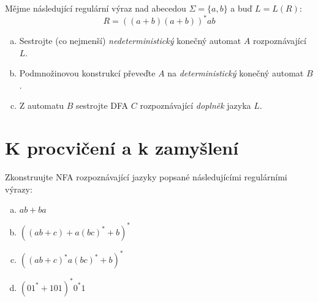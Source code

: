 \documentclass[a4paper,12pt]{amsart}
\begin{document}
\medskip\begin{problem}
    
    Mějme následující regulární výraz nad abecedou $\Sigma=\{a,b\}$ a buď $L=L(R)$:
    \[
        R=((a + b)(a + b))^*ab
    \]
  
    \smallskip

    \begin{enumerate}[(a)]
        \item Sestrojte (co nejmenší) \emph{nedeterministický} konečný automat $A$ rozpoznávající $L$.
        \item Podmnožinovou konstrukcí převeďte $A$ na \emph{deterministický} konečný automat $B$.
        \item Z automatu $B$ sestrojte DFA $C$  rozpoznávající \emph{doplněk} jazyka $L$.
    \end{enumerate}

\end{problem}

\medskip

\section*{K procvičení a k zamyšlení}


\begin{problem}

    Zkonstruujte NFA rozpoznávající jazyky popsané následujícími regulárními výrazy:
    
    \vspace{-6pt}
    \begin{multicols}{2}
    
        \begin{enumerate}[(a)]\setlength\itemsep{0pt}
            \item $ab + ba$
            \item $((ab + c)+a(bc)^* + b)^*$
            \item $((ab + c)^*a(bc)^* + b)^*$
            \item $(01^* + 101)^*0^*1$
        \end{enumerate}
    
    \end{multicols}
    
\end{problem}
\end{document}
